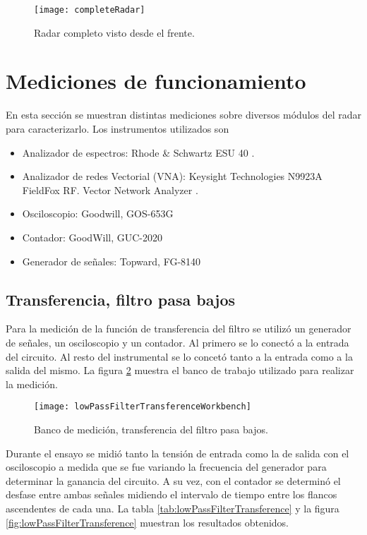 \begin{figure}[H]
 \centering
 \texttt{[image: completeRadar]}
 \caption{Radar completo visto desde el frente.}
 \label{fig:completeRadar}
\end{figure}


\section{Mediciones de funcionamiento}

En esta sección se muestran distintas mediciones sobre diversos módulos del radar para caracterizarlo.
Los instrumentos utilizados son
\begin{itemize}
  \item Analizador de espectros: Rhode \& Schwartz ESU 40 \cite{spectrumAnalyzer}.
  \item Analizador de redes Vectorial (VNA): Keysight Technologies N9923A FieldFox RF.
Vector Network Analyzer \cite{VNA}.
  \item Osciloscopio: Goodwill, GOS-653G
  \item Contador: GoodWill, GUC-2020
  \item Generador de señales: Topward, FG-8140
\end{itemize}

\subsection{Transferencia, filtro pasa bajos}

Para la medición de la función de transferencia del filtro se utilizó un generador de señales, un osciloscopio y un contador. Al primero se lo conectó a la entrada del circuito. Al resto del instrumental se lo concetó tanto a la entrada como a la salida del mismo. La figura \ref{fig:lowPassFilterConnections} muestra el banco de trabajo utilizado para realizar la medición.

\begin{figure}[H]
 \centering
 \texttt{[image: lowPassFilterTransferenceWorkbench]}
 \caption{Banco de medición, transferencia del filtro pasa bajos.}
 \label{fig:lowPassFilterConnections}
\end{figure}

Durante el ensayo se midió tanto la tensión de entrada como la de salida con el osciloscopio a medida que se fue variando la frecuencia del generador para determinar la ganancia del circuito. A su vez, con el contador se determinó el desfase entre ambas señales midiendo el intervalo de tiempo entre los flancos ascendentes de cada una. La tabla \ref{tab:lowPassFilterTransference} y la figura \ref{fig:lowPassFilterTransference} muestran los resultados obtenidos.

